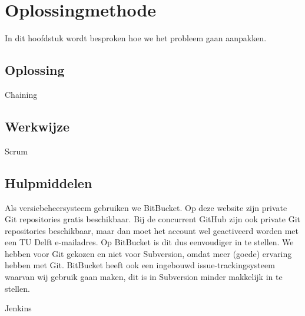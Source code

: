 \section{Oplossingmethode}
In dit hoofdstuk wordt besproken hoe we het probleem gaan aanpakken. 

\subsection{Oplossing}
Chaining

\subsection{Werkwijze}
Scrum

\subsection{Hulpmiddelen}
Als versiebeheersysteem gebruiken we BitBucket. Op deze website zijn private Git repositories gratis beschikbaar. Bij de concurrent GitHub zijn ook private Git repositories beschikbaar, maar dan moet het account wel geactiveerd worden met een TU Delft e-mailadres. Op BitBucket is dit dus eenvoudiger in te stellen. We hebben voor Git gekozen en niet voor Subversion, omdat meer (goede) ervaring hebben met Git. BitBucket heeft ook een ingebouwd issue-trackingsysteem waarvan wij gebruik gaan maken, dit is in Subversion minder makkelijk in te stellen.

Jenkins
